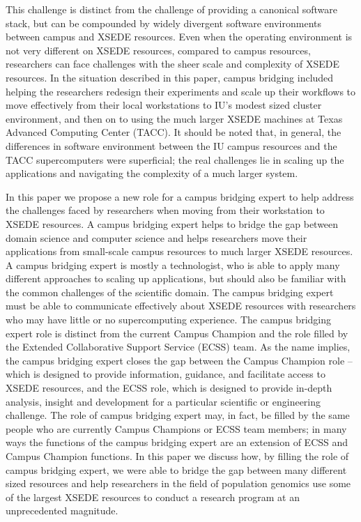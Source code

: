 \documentclass{sig-alternate}
\begin{document}
This challenge is distinct from the challenge of providing a canonical software stack, but can be compounded
by widely divergent software environments between campus and XSEDE resources. Even when the operating
environment is not very different on XSEDE resources, compared to campus resources, researchers can face
challenges with the sheer scale and complexity of XSEDE resources. In the situation described in this paper,
campus bridging included helping the researchers redesign their experiments and scale up their workflows to
move effectively from their local workstations to IU's modest sized cluster environment, and then on to using
the much larger XSEDE machines at Texas Advanced Computing Center (TACC). It should be noted that, in general, the differences in software
environment between the IU campus resources and the TACC supercomputers were superficial; the real challenges
lie in scaling up the applications and navigating the complexity of a much larger system.

In this paper we propose a new role for a campus bridging expert to help address the challenges
faced by researchers when moving from their workstation to XSEDE resources. A campus bridging expert helps
to bridge the gap between domain science and computer science and helps researchers
   move their applications from small-scale campus resources to much larger XSEDE resources. A campus
bridging expert is mostly a technologist, who is able to apply many different approaches to scaling up
applications, but should also be familiar with the common challenges of the scientific domain. The campus bridging expert must be able to
communicate effectively about XSEDE resources with researchers who may have little or no supercomputing experience. The
campus bridging expert role is distinct from the current Campus Champion and the role filled by the Extended
Collaborative Support Service (ECSS) team. As the name implies, the campus bridging expert closes the gap
between the Campus Champion role -- which is designed to provide information, guidance, and facilitate access
to XSEDE resources, and the ECSS role, which is designed to provide in-depth analysis, insight and development
for a particular scientific or engineering challenge. The role of campus bridging expert may, in fact, be
filled by the same people who are currently Campus Champions or ECSS team members; in many ways the functions
of the campus bridging expert are an extension of ECSS and Campus Champion functions. In this paper we discuss
how, by filling the role of campus bridging expert, we were able to bridge the gap between many different
sized resources and help researchers in the field of population genomics use some of the largest XSEDE
resources to conduct a research program at an unprecedented magnitude.
\end{document}
